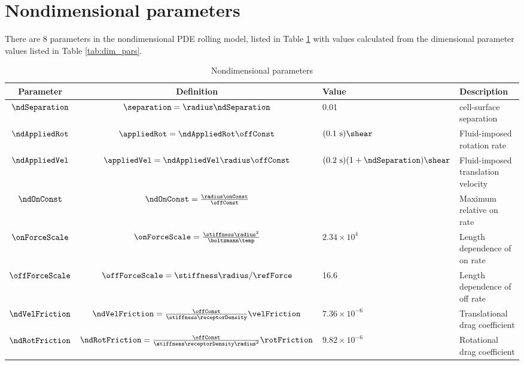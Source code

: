 \section{Nondimensional parameters}
\label{sec:nd-params}

There are 8 parameters in the nondimensional PDE rolling model, listed
in Table \ref{tab:nd-params} with values calculated from the
dimensional parameter values listed in Table \ref{tab:dim_pars}.

\begin{table}
  \renewcommand*{\arraystretch}{1.5}
  \centering
  \begin{tabular}{ccll}
    \toprule
    Parameter & Definition & Value & Description \\ \midrule
    $\ndSeparation$ & $\separation = \radius\ndSeparation$ & 0.01
                                   & cell-surface separation \\
    $\ndAppliedRot$ & $\appliedRot = \ndAppliedRot\offConst$
                           & $(0.1 \text{ s})\shear$ & Fluid-imposed
                                                       rotation rate
    \\
    $\ndAppliedVel$ & $\appliedVel = \ndAppliedVel\radius\offConst$
                           & $(0.2 \text{ s}) (1 + \ndSeparation)
                             \shear$
                                   & Fluid-imposed translation
                                     velocity \\
    $\ndOnConst$ & $\ndOnConst = \frac{\radius\onConst}{\offConst}$
                           &  & Maximum relative on rate \\
    $\onForceScale$ & $\onForceScale =
                    \frac{\stiffness\radius^2}{\boltzmann\temp}$
                           & $2.34 \times 10^4$ & Length dependence of
                                                  on rate \\
    $\offForceScale$ & $\offForceScale = \stiffness\radius/\refForce$
                           & 16.6 & Length dependence of off rate \\
    $\ndVelFriction$ & $\ndVelFriction =
                     \frac{\offConst}{\stiffness\receptorDensity}
                       \velFriction$ & $7.36 \times 10^{-6}$
                                   & Translational drag coefficient \\
    $\ndRotFriction$ & $\ndRotFriction =
                     \frac{\offConst}{\stiffness\receptorDensity
                                      \radius^2}\rotFriction$
                           & $9.82 \times 10^{-6}$ & Rotational drag
                                                     coefficient \\
    \bottomrule
  \end{tabular}
  \caption{Nondimensional parameters}
  \label{tab:nd-params}
\end{table}


